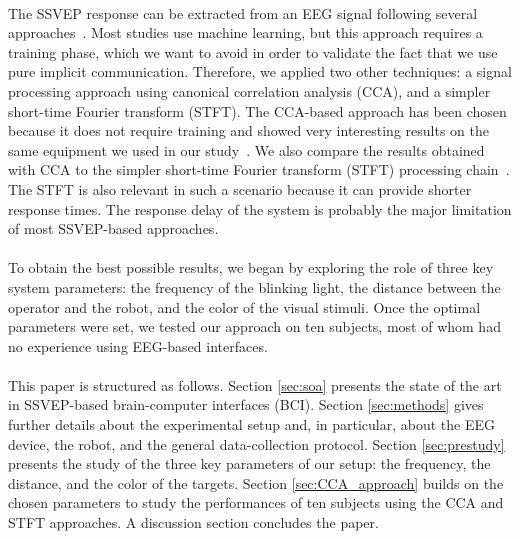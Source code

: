 \documentclass[smallextended]{svjour3}
\begin{document}
\\ 
The SSVEP response can be extracted from an EEG signal following several approaches~\cite{Bi2013}. 
Most studies use machine learning, but this approach requires a training phase, which we want to avoid in order to validate the fact that we use pure implicit communication.
Therefore, we applied two other techniques: a signal processing approach using canonical correlation analysis (CCA), and a simpler short-time Fourier transform (STFT).
The CCA-based approach has been chosen because it does not require training and showed very interesting results on the same equipment we used in our study~\cite{Lin2014}.
We also compare the results obtained with CCA to the simpler short-time Fourier transform (STFT) processing chain~\cite{Durak2003}. The STFT is also relevant in such a scenario because it can provide shorter response times. 
The response delay of the system is probably the major limitation of most SSVEP-based approaches.\\
\\
To obtain the best possible results, we began by exploring the role of three key system parameters: the frequency of the blinking light, the distance between the operator and the robot, and the color of the visual stimuli. 
Once the optimal parameters were set, we tested our approach on ten subjects, most of whom had no experience using EEG-based interfaces. \\
\\
This paper is structured as follows. Section \ref{sec:soa} presents the state of the art in SSVEP-based brain-computer interfaces (BCI). Section \ref{sec:methods} gives further details about the experimental setup and, in particular, about the EEG device, the robot, and the general data-collection protocol. 
Section \ref{sec:prestudy} presents the study of the three key parameters of our setup: the frequency, the distance, and the color of the targets. Section \ref{sec:CCA_approach} builds on the chosen parameters to study the performances of ten subjects using the CCA and STFT approaches. A discussion section concludes the paper.
\end{document}
